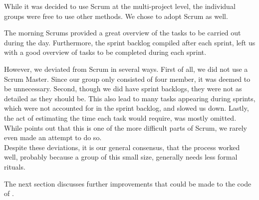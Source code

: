 While it was decided to use Scrum at the multi-project level, the individual groups were free to use other methods.
We chose to adopt Scrum as well.

The morning Scrums provided a great overview of the tasks to be carried out during the day.
Furthermore, the sprint backlog compiled after each sprint, left us with a good overview of tasks to be completed during each sprint.

However, we deviated from Scrum in several ways.
First of all, we did not use a Scrum Master.
Since our group only consisted of four member, it was deemed to be unnecessary.
Second, though we did have sprint backlogs, they were not as detailed as they should be.
This also lead to many tasks appearing during sprints, which were not accounted for in the sprint backlog, and slowed us down.
Lastly, the act of estimating the time each task would require, was mostly omitted.
While \citet{larmanAgile} points out that this is one of the more difficult parts of Scrum, we rarely even made an attempt to do so.\\

Despite these deviations, it is our general consensus, that the process worked well, probably because a group of this small size, generally needs less formal rituals.


The next section discusses further improvements that could be made to the code of \launcher.